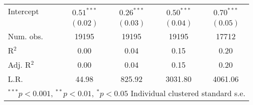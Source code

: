 \begin{table}
\begin{center}
\begin{tabular}{l c c c c }
Intercept       & $0.51^{***}$ & $0.26^{***}$ & $0.50^{***}$  & $0.70^{***}$  \\
                & $(0.02)$     & $(0.03)$     & $(0.04)$      & $(0.05)$      \\
\hline
Num. obs.       & 19195        & 19195        & 19195         & 17712         \\
R$^2$           & 0.00         & 0.04         & 0.15          & 0.20          \\
Adj. R$^2$      & 0.00         & 0.04         & 0.15          & 0.20          \\
L.R.            & 44.98        & 825.92       & 3031.80       & 4061.06       \\
\hline
\multicolumn{5}{l}{\scriptsize{$^{***}p<0.001$, $^{**}p<0.01$, $^*p<0.05$ Individual clustered standard s.e.}}
\end{tabular}
\label{table:main_lm_models}
\end{center}
\end{table}
